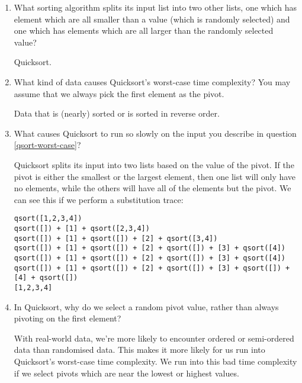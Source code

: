 \documentclass[11pt]{article}
\newenvironment{answer}{\large\lstset{basicstyle=\large}\color{white}}{}
\newenvironment{answer}{\large\lstset{basicstyle=\large}\color{red}}{}
\begin{document}
\begin{enumerate}
\item What sorting algorithm splits its input list into two other lists, one
      which has element which are all smaller than a value (which is randomly
      selected) and one which has elements which are all larger than the
      randomly selected value?

    \begin{answer}
    Quicksort.
    \end{answer}

\item\label{qsort-worst-case} What kind of data causes Quicksort's worst-case
      time complexity? You may assume that we always pick the first element as
      the pivot.

      \begin{answer}
      Data that is (nearly) sorted or is sorted in reverse order.
      \end{answer}

\item What causes Quicksort to run so slowly on the input you describe in
      question \ref{qsort-worst-case}?

    \begin{answer}
    Quicksort splits its input into two lists based on the value of the pivot.
    If the pivot is either the smallest or the largest element, then one list
    will only have no elements, while the others will have all of the elements
    but the pivot. We can see this if we perform a substitution trace:

\begin{verbatim}
qsort([1,2,3,4])
qsort([]) + [1] + qsort([2,3,4])
qsort([]) + [1] + qsort([]) + [2] + qsort([3,4])
qsort([]) + [1] + qsort([]) + [2] + qsort([]) + [3] + qsort([4])
qsort([]) + [1] + qsort([]) + [2] + qsort([]) + [3] + qsort([4])
qsort([]) + [1] + qsort([]) + [2] + qsort([]) + [3] + qsort([]) + [4] + qsort([])
[1,2,3,4]
\end{verbatim}
    \end{answer}

\item In Quicksort, why do we select a random pivot value, rather than always
      pivoting on the first element?

      \begin{answer}
      With real-world data, we're more likely to encounter ordered or
      semi-ordered data than randomised data. This makes it more likely for us
      run into Quicksort's worst-case time complexity. We run into this bad
      time complexity if we select pivots which are near the lowest or highest
      values.


\end{answer}
\end{enumerate}
\end{document}
